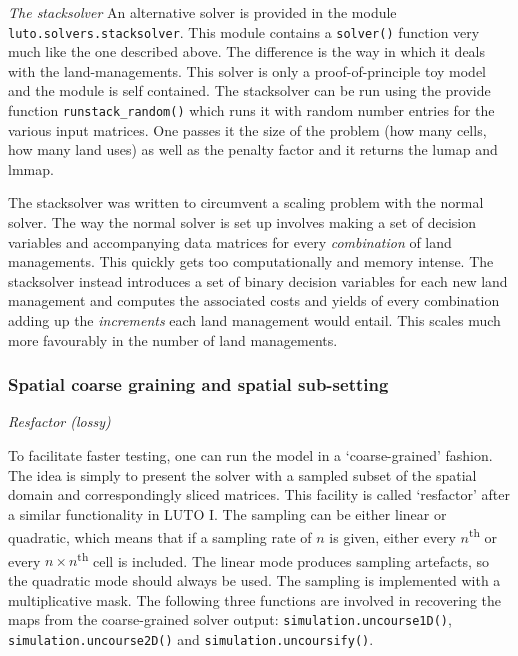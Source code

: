 \documentclass[12pt,a4paper,twoside]{article}
\begin{document}
\emph{The stacksolver}
An alternative solver is provided in the module \texttt{luto.solvers.stacksolver}. This module contains a \texttt{solver()} function very much like the one described above. The difference is the way in which it deals with the land-managements. This solver is only a proof-of-principle toy model and the module is self contained. The stacksolver can be run using the provide function \texttt{runstack_random()} which runs it with random number entries for the various input matrices. One passes it the size of the problem (how many cells, how many land uses) as well as the penalty factor and it returns the lumap and lmmap.

The stacksolver was written to circumvent a scaling problem with the normal solver. The way the normal solver is set up involves making a set of decision variables and accompanying data matrices for every \emph{combination} of land managements. This quickly gets too computationally and memory intense. The stacksolver instead introduces a set of binary decision variables for each new land management and computes the associated costs and yields of every combination adding up the \emph{increments} each land management would entail. This scales much more favourably in the number of land managements.

\subsubsection{Spatial coarse graining and spatial sub-setting}

\emph{Resfactor (lossy)}

To facilitate faster testing, one can run the model in a `coarse-grained' fashion. The idea is simply to present the solver with a sampled subset of the spatial domain and correspondingly sliced matrices. This facility is called `resfactor' after a similar functionality in LUTO I. The sampling can be either linear or quadratic, which means that if a sampling rate of $n$ is given, either every $n$\textsuperscript{th} or every $n \times n$\textsuperscript{th} cell is included. The linear mode produces sampling artefacts, so the quadratic mode should always be used. The sampling is implemented with a multiplicative mask. The following three functions are involved in recovering the maps from the coarse-grained solver output: \texttt{simulation.uncourse1D()}, \texttt{simulation.uncourse2D()} and \texttt{simulation.uncoursify()}.
\end{document}
